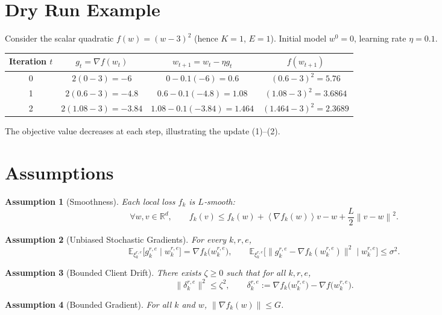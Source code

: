 \documentclass{article}
\newtheorem{assumption}{Assumption}
\newcommand{\EE}{\mathbb{E}}
\newcommand{\RR}{\mathbb{R}}
\newcommand{\norm}[1]{\left\|#1\right\|}
\newcommand{\inner}[1]{\left\langle#1\right\rangle}
\begin{document}
\section*{Dry Run Example}
Consider the scalar quadratic $f(w)=(w-3)^2$ (hence $K=1$, $E=1$).  
Initial model $w^{0}=0$, learning rate $\eta=0.1$.

\begin{tabular}{c|c|c|c}
Iteration $t$ & $g_t=\nabla f(w_t)$ & $w_{t+1}=w_t-\eta g_t$ & $f(w_{t+1})$\\\hline
0 & $2(0-3)=-6$ & $0-0.1(-6)=0.6$ & $(0.6-3)^2=5.76$\\
1 & $2(0.6-3)=-4.8$ & $0.6-0.1(-4.8)=1.08$ & $(1.08-3)^2=3.6864$\\
2 & $2(1.08-3)=-3.84$ & $1.08-0.1(-3.84)=1.464$ & $(1.464-3)^2=2.3689$\\
\end{tabular}

The objective value decreases at each step, illustrating the update (1)–(2).

\newpage
\section*{Assumptions}
\begin{assumption}[Smoothness]\label{as:smooth}
Each local loss $f_k$ is $L$‑smooth:
\[
\forall w,v\in\RR^d,\qquad
f_k(v)\le f_k(w)+\inner{\nabla f_k(w)}{v-w}+\frac{L}{2}\norm{v-w}^2.
\]
\end{assumption}

\begin{assumption}[Unbiased Stochastic Gradients]\label{as:unbiased}
For every $k,r,e$,
\[
\EE_{\xi_{k}^{r,e}}\!\bigl[g_{k}^{r,e}\mid w_{k}^{r,e}\bigr]=\nabla f_k\!\bigl(w_{k}^{r,e}\bigr),
\qquad
\EE_{\xi_{k}^{r,e}}\!\bigl[\|g_{k}^{r,e}-\nabla f_k(w_{k}^{r,e})\|^2\mid w_{k}^{r,e}\bigr]\le\sigma^2 .
\]
\end{assumption}

\begin{assumption}[Bounded Client Drift]\label{as:drift}
There exists $\zeta\ge0$ such that for all $k,r,e$,
\[
\|\delta_{k}^{r,e}\|^2\le \zeta^2,\qquad
\delta_{k}^{r,e}:=\nabla f_k\!\bigl(w_{k}^{r,e}\bigr)-\nabla f\!\bigl(w_{k}^{r,e}\bigr).
\]
\end{assumption}

\begin{assumption}[Bounded Gradient]\label{as:grad}
For all $k$ and $w$, $\|\nabla f_k(w)\|\le G$.
\end{assumption}
\end{document}

